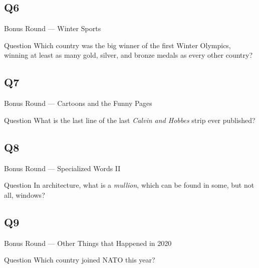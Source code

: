 \documentclass[11pt]{beamer}
\begin{document}
\subsection*{Q6}
\begin{frame}[t]{Bonus Round --- Winter Sports}
    \vspace{-0.5em}
    \begin{block}{Question}
        Which country was the big winner of the first Winter Olympics, winning at least as many gold, silver, and bronze medals as every other country?
    \end{block}
\end{frame}
\subsection*{Q7}
\begin{frame}[t]{Bonus Round --- Cartoons and the Funny Pages}
    \vspace{-0.5em}
    \begin{block}{Question}
        What is the last line of the last \emph{Calvin and Hobbes} strip ever published?
    \end{block}
\end{frame}
\subsection*{Q8}
\begin{frame}[t]{Bonus Round --- Specialized Words II}
    \vspace{-0.5em}
    \begin{block}{Question}
        In architecture, what is a \emph{mullion}, which can be found in some, but not all, windows?
    \end{block}
\end{frame}
\subsection*{Q9}
\begin{frame}[t]{Bonus Round --- Other Things that Happened in 2020}
    \vspace{-0.5em}
    \begin{block}{Question}
        Which country joined NATO this year?
    \end{block}
\end{frame}
\end{document}
